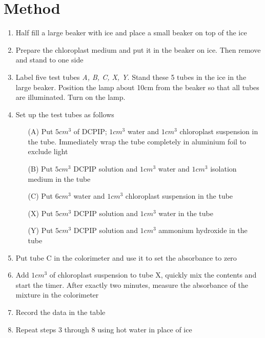 \documentclass{thomasClass}
\begin{document}
\section{Method}
\begin{enumerate}
    \item Half fill a large beaker with ice and place a small beaker on top of the ice
    \item Prepare the chloroplast medium and put it in the beaker on ice. Then remove and stand to one side
    \item Label five test tubes \textit{A, B, C, X, Y}. Stand these 5 tubes in the ice in the large beaker. Position the lamp about 10cm from the beaker so that all tubes are illuminated. Turn on the lamp.
    \item Set up the test tubes as follows
    \begin{enumerate}
        \item[(A)] Put $5cm^3$ of DCPIP; $1cm^3$ water and $1cm^3$ chloroplast suspension in the tube. Immediately wrap the tube completely in aluminium foil to exclude light
        \item[(B)] Put $5cm^3$  DCPIP solution and $1cm^3$ water and $1cm^3$ isolation medium in the tube
        \item[(C)] Put $6cm^3$ water and $1cm^3$ chloroplast suspension in the tube
        \item[(X)] Put $5cm^3$ DCPIP solution and $1cm^3$ water in the tube
        \item[(Y)] Put $5cm^3$ DCPIP solution and $1cm^3$ ammonium hydroxide in the tube
    \end{enumerate}
    \item Put tube C in the colorimeter and use it to set the absorbance to zero
    \item Add $1cm^3$ of chloroplast suspension to tube X, quickly mix the contents and start the timer. After exactly two minutes, measure the absorbance of the mixture in the colorimeter
    \item Record the data in the table
    \item Repeat steps 3 through 8 using hot water in place of ice
\end{enumerate}
\end{document}
